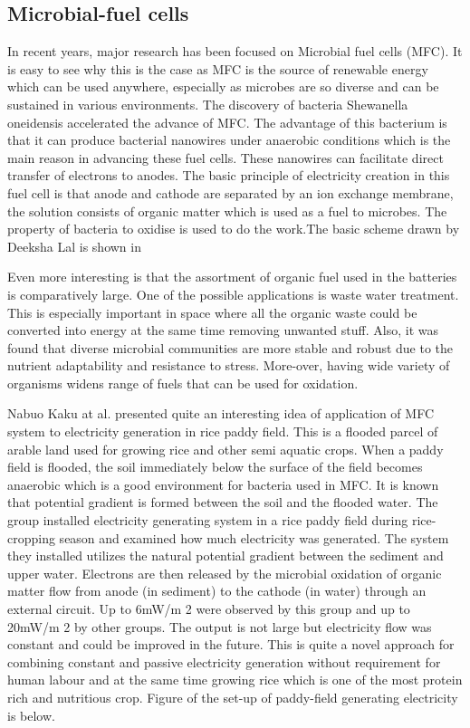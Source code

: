 \documentclass[12pt]{article}
\begin{document}
\subsection{Microbial-fuel cells}

In recent years, major research has been focused on Microbial fuel cells (MFC). It is easy to see why this is the case as MFC is the source of renewable energy which can be used anywhere, especially as microbes are so diverse and can be sustained in various environments. The discovery of bacteria Shewanella oneidensis accelerated the advance of MFC. The advantage of
this bacterium is that it can produce bacterial nanowires under anaerobic conditions which is the main reason in advancing these fuel cells. These nanowires can facilitate direct transfer of
electrons to anodes. The basic principle of electricity creation in this fuel cell is that anode and cathode are separated by an ion exchange membrane, the solution consists of organic matter which is used as a fuel to microbes. The property of bacteria to oxidise is used to do the work.The basic scheme drawn by Deeksha Lal is shown in 

Even more interesting is that the assortment of organic fuel used in the batteries is comparatively large.
One of the possible applications is waste water treatment. This is especially important in space where all the organic waste could be converted into energy at the same time removing unwanted stuff. Also, it was found that diverse microbial communities are more stable and robust due to the nutrient adaptability and resistance to stress. More-over, having wide variety of organisms widens range of fuels that can be used for oxidation.

Nabuo Kaku at al. presented quite an interesting idea of application of MFC system to electricity generation in rice paddy field. This is a flooded parcel of arable land used for growing rice and other semi aquatic crops. When a paddy field is flooded, the soil immediately below the surface of the field becomes anaerobic which is a good environment for bacteria used in MFC. It is known that potential gradient is formed between the soil and the flooded water.
The group installed electricity generating system in a rice paddy field during rice-cropping season and examined how much electricity was generated. The system they installed utilizes the natural potential gradient between the sediment and upper water. Electrons are then released by the microbial oxidation of organic matter flow from anode (in sediment) to the cathode (in water) through an external circuit. Up to 6mW/m 2 were observed by this group and up to
20mW/m 2 by other groups. The output is not large but electricity flow was constant and could be improved in the future. This is quite a novel approach for combining constant and passive electricity generation without requirement for human labour and at the same time growing rice which is one of the most protein rich and nutritious crop. Figure of the set-up of paddy-field generating electricity is below.
\end{document}

